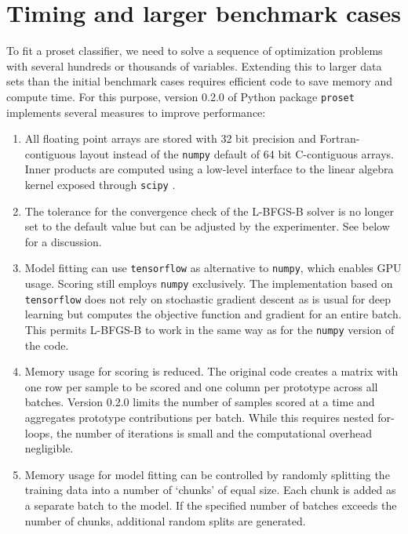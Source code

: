 \section{Timing and larger benchmark cases}
\label{sec_timing_larger_cases}
%
\begin{center}\end{center}
%
To fit a proset classifier, we need to solve a sequence of optimization problems with several hundreds or thousands of variables.
Extending this to larger data sets than the initial benchmark cases requires efficient code to save memory and compute time.
For this purpose, version 0.2.0 of Python package \texttt{proset} implements several measures to improve performance:
%
\begin{enumerate}
\item All floating point arrays are stored with 32 bit precision and Fortran-contiguous layout instead of the \texttt{numpy} \cite{Harris_20} default of 64 bit C-contiguous arrays.
Inner products are computed using a low-level interface to the linear algebra kernel exposed through \texttt{scipy} \cite{Virtanen_20}.
%
\item The tolerance for the convergence check of the L-BFGS-B solver is no longer set to the default value but can be adjusted by the experimenter.
See below for a discussion.
%
\item Model fitting can use \texttt{tensorflow} \cite{Abadi_15} as alternative to \texttt{numpy}, which enables GPU usage.
Scoring still employs \texttt{numpy} exclusively.
The implementation based on \texttt{tensorflow} does not rely on stochastic gradient descent as is usual for deep learning but computes the objective function and gradient for an entire batch.
This permits L-BFGS-B to work in the same way as for the \texttt{numpy} version of the code.
%
\item Memory usage for scoring is reduced.
The original code creates a matrix with one row per sample to be scored and one column per prototype across all batches.
Version 0.2.0 limits the number of samples scored at a time and aggregates prototype contributions per batch.
While this requires nested for-loops, the number of iterations is small and the computational overhead negligible.
%
\item Memory usage for model fitting can be controlled by randomly splitting the training data into a number of `chunks' of equal size.
Each chunk is added as a separate batch to the model.
If the specified number of batches exceeds the number of chunks, additional random splits are generated.
\end{enumerate}
